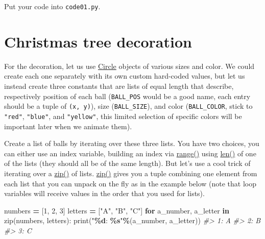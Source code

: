 \documentclass[
]{book}
\newenvironment{Shaded}{\begin{snugshade}}{\end{snugshade}}
\newcommand{\BuiltInTok}[1]{#1}
\newcommand{\CommentTok}[1]{\textcolor[rgb]{0.56,0.35,0.01}{\textit{#1}}}
\newcommand{\ControlFlowTok}[1]{\textcolor[rgb]{0.13,0.29,0.53}{\textbf{#1}}}
\newcommand{\DecValTok}[1]{\textcolor[rgb]{0.00,0.00,0.81}{#1}}
\newcommand{\KeywordTok}[1]{\textcolor[rgb]{0.13,0.29,0.53}{\textbf{#1}}}
\newcommand{\NormalTok}[1]{#1}
\newcommand{\OperatorTok}[1]{\textcolor[rgb]{0.81,0.36,0.00}{\textbf{#1}}}
\newcommand{\SpecialCharTok}[1]{\textcolor[rgb]{0.81,0.36,0.00}{\textbf{#1}}}
\newcommand{\StringTok}[1]{\textcolor[rgb]{0.31,0.60,0.02}{#1}}
\begin{document}
Put your code into \texttt{code01.py}.

\hypertarget{christmas-tree-decoration}{%
\section{Christmas tree decoration}\label{christmas-tree-decoration}}

For the decoration, let us use \href{https://psychopy.org/api/visual/circle.html\#psychopy.visual.circle.Circle}{Circle} objects of various sizes and color. We could create each one separately with its own custom hard-coded values, but let us instead create three constants that are lists of equal length that describe, respectively position of each ball (\texttt{BALL\_POS} would be a good name, each entry should be a tuple of \texttt{(x,\ y)}), size (\texttt{BALL\_SIZE}), and color (\texttt{BALL\_COLOR}, stick to \texttt{"red"}, \texttt{"blue"}, and \texttt{"yellow"}, this limited selection of specific colors will be important later when we animate them).

Create a list of balls by iterating over these three lists. You have two choices, you can either use an index variable, building an index via \href{https://docs.python.org/3/library/functions.html\#func-range}{range()} using \href{https://docs.python.org/3/library/functions.html\#len}{len()} of one of the lists (they should all be of the same length). But let's use a cool trick of iterating over a \href{https://docs.python.org/3/library/functions.html\#zip}{zip()} of lists. \href{https://docs.python.org/3/library/functions.html\#zip}{zip()} gives you a tuple combining one element from each list that you can unpack on the fly as in the example below (note that loop variables will receive values in the order that you used for lists).

\begin{Shaded}
\begin{Highlighting}[]
\NormalTok{numbers }\OperatorTok{=}\NormalTok{ [}\DecValTok{1}\NormalTok{, }\DecValTok{2}\NormalTok{, }\DecValTok{3}\NormalTok{]}
\NormalTok{letters }\OperatorTok{=}\NormalTok{ [}\StringTok{"A"}\NormalTok{, }\StringTok{"B"}\NormalTok{, }\StringTok{"C"}\NormalTok{]}
\ControlFlowTok{for}\NormalTok{  a\_number, a\_letter }\KeywordTok{in}  \BuiltInTok{zip}\NormalTok{(numbers, letters):}
  \BuiltInTok{print}\NormalTok{(}\StringTok{"}\SpecialCharTok{\%d}\StringTok{: }\SpecialCharTok{\%s}\StringTok{"}\OperatorTok{\%}\NormalTok{(a\_number, a\_letter))}
\CommentTok{\#\textgreater{} 1: A}
\CommentTok{\#\textgreater{} 2: B}
\CommentTok{\#\textgreater{} 3: C}
\end{Highlighting}
\end{Shaded}
\end{document}
